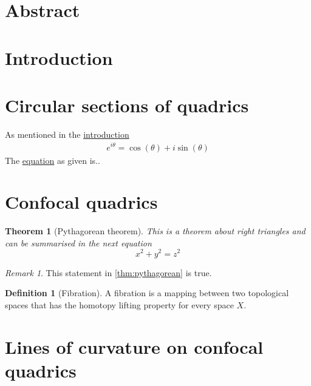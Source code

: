 \documentclass[12pt,a4paper]{article}
\newtheorem{theorem}{Theorem}[section]
\theoremstyle{definition}
\newtheorem{definition}{Definition}[section]
\theoremstyle{remark}
\newtheorem*{remark}{Remark}
\begin{document}
\pagestyle{fancy}
\section*{Abstract} \label{sec:abstract}
\pagebreak
\pagestyle{tocstyle}
\renewcommand{\contentsname}{Contents}
\tableofcontents
\pagebreak
\listoffigures
\pagebreak
\pagestyle{fancy}
\section{Introduction} \label{sec:introduction}
\pagebreak
\section{Circular sections of quadrics}
As mentioned in the \hyperref[sec:introduction]{introduction}
\begin{align} \label{eq:Euler}
    e^{i \theta} = \cos(\theta)+i\sin(\theta)
\end{align}
The \hyperref[eq:Euler]{equation} as given is..
\pagebreak
\section{Confocal quadrics}
\begin{theorem}[Pythagorean theorem]
\label{thm:pythagorean}
This is a theorem about right triangles and can be summarised in the next
equation
\[ x^2 + y^2 = z^2 \]
\end{theorem}
\begin{remark}
This statement in \autoref{thm:pythagorean} is true.
\end{remark}

\begin{definition}[Fibration]
\label{def:fibration}
A fibration is a mapping between two topological spaces that has the homotopy lifting property for every space \(X\).
\end{definition}
\pagebreak
\section{Lines of curvature on confocal quadrics}
\pagebreak
\end{document}
